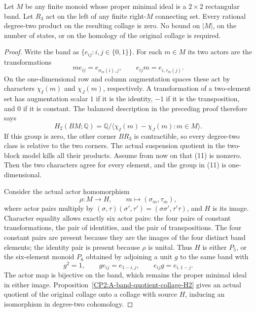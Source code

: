 \begin{theorem}
\label{CP2:A-two-by-two-band-right-zero-all-states}
Let $M$ be any finite monoid whose proper minimal ideal is a
$2\times2$ rectangular band.  Let $R_3$ act on the left of any finite
right-$M$ connecting set.  Every rational degree-two product on the
resulting collage is zero.  No bound on $|M|$, on the number of states,
or on the homology of the original collage is required.
\end{theorem}
\begin{proof}
Write the band as $\{e_{ij}:i,j\in\{0,1\}\}$.
For each $m\in M$ its two actors are the transformations
\[
 me_{ij}=e_{\sigma_m(i),j},\qquad
 e_{ij}m=e_{i,\tau_m(j)}.
\]
On the one-dimensional row and column augmentation spaces these
act by characters $\chi_I(m)$ and $\chi_J(m)$, respectively.
A transformation of a two-element set has augmentation scalar $1$
if it is the identity, $-1$ if it is the transposition, and $0$ if
it is constant.  The balanced description in the preceding proof
therefore says
\[
 H_2(BM;\mathbb Q)=
 \mathbb Q\big/\langle\chi_I(m)-\chi_J(m):m\in M\rangle.
                                                               \tag{11}
\]
If this group is zero, the other corner $BR_3$ is contractible, so
every degree-two class is relative to the two corners.  The actual
suspension quotient in the two-block model kills all their products.
Assume from now on that (11) is nonzero.  Then the two characters
agree for every element, and the group in (11) is one-dimensional.

Consider the actual actor homomorphism
\[
 \rho:M\longrightarrow H,\qquad
 m\longmapsto(\sigma_m,\tau_m),
\]
where actor pairs multiply by
$(\sigma,\tau)(\sigma',\tau')=(\sigma\sigma',\tau'\tau)$,
and $H$ is its image.  Character equality allows exactly six actor
pairs: the four pairs of constant transformations, the pair of
identities, and the pair of transpositions.  The four constant pairs
are present because they are the images of the four distinct band
elements; the identity pair is present because $\rho$ is unital.
Thus $H$ is either $P_5$, or the six-element monoid $P_6$ obtained by
adjoining a unit $g$ to the same band with
\[
 g^2=1,\qquad ge_{ij}=e_{1-i,j},\qquad e_{ij}g=e_{i,1-j}.
                                                               \tag{12}
\]
The actor map is bijective on the band, which remains the proper
minimal ideal in either image.  Proposition~\ref{CP2:A-band-quotient-collage-H2}
gives an actual quotient of the original collage onto a collage
with source $H$, inducing an isomorphism in degree-two cohomology.


\end{proof}
